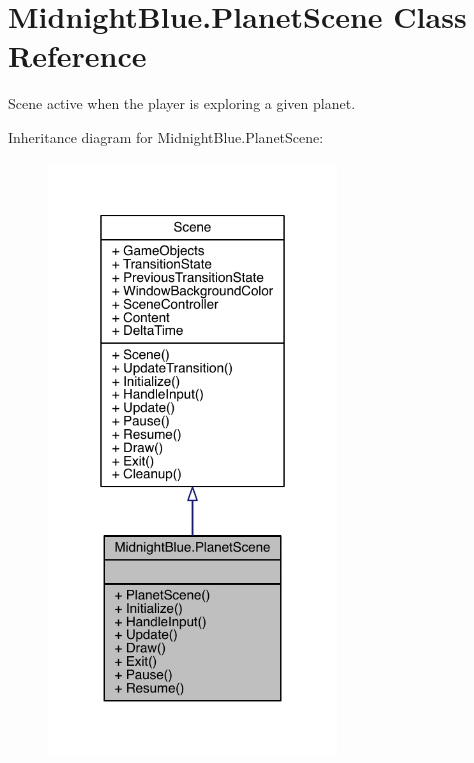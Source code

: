 \hypertarget{class_midnight_blue_1_1_planet_scene}{}\section{Midnight\+Blue.\+Planet\+Scene Class Reference}
\label{class_midnight_blue_1_1_planet_scene}


Scene active when the player is exploring a given planet.  




Inheritance diagram for Midnight\+Blue.\+Planet\+Scene\+:
\nopagebreak
\begin{figure}[H]
\begin{center}
\leavevmode
\includegraphics[width=217pt]{class_midnight_blue_1_1_planet_scene__inherit__graph}
\end{center}
\end{figure}


